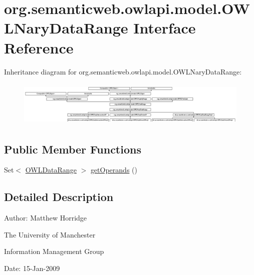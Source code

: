 \hypertarget{interfaceorg_1_1semanticweb_1_1owlapi_1_1model_1_1_o_w_l_nary_data_range}{\section{org.\-semanticweb.\-owlapi.\-model.\-O\-W\-L\-Nary\-Data\-Range Interface Reference}
\label{interfaceorg_1_1semanticweb_1_1owlapi_1_1model_1_1_o_w_l_nary_data_range}
}
Inheritance diagram for org.\-semanticweb.\-owlapi.\-model.\-O\-W\-L\-Nary\-Data\-Range\-:\begin{figure}[H]
\begin{center}
\leavevmode
\includegraphics[height=2.183844cm]{interfaceorg_1_1semanticweb_1_1owlapi_1_1model_1_1_o_w_l_nary_data_range}
\end{center}
\end{figure}
\subsection*{Public Member Functions}
\begin{DoxyCompactItemize}
\item 
Set$<$ \hyperlink{interfaceorg_1_1semanticweb_1_1owlapi_1_1model_1_1_o_w_l_data_range}{O\-W\-L\-Data\-Range} $>$ \hyperlink{interfaceorg_1_1semanticweb_1_1owlapi_1_1model_1_1_o_w_l_nary_data_range_ae68302680e3a9050c2485e9f21d8879f}{get\-Operands} ()
\end{DoxyCompactItemize}


\subsection{Detailed Description}
Author\-: Matthew Horridge\par
 The University of Manchester\par
 Information Management Group\par
 Date\-: 15-\/\-Jan-\/2009 

